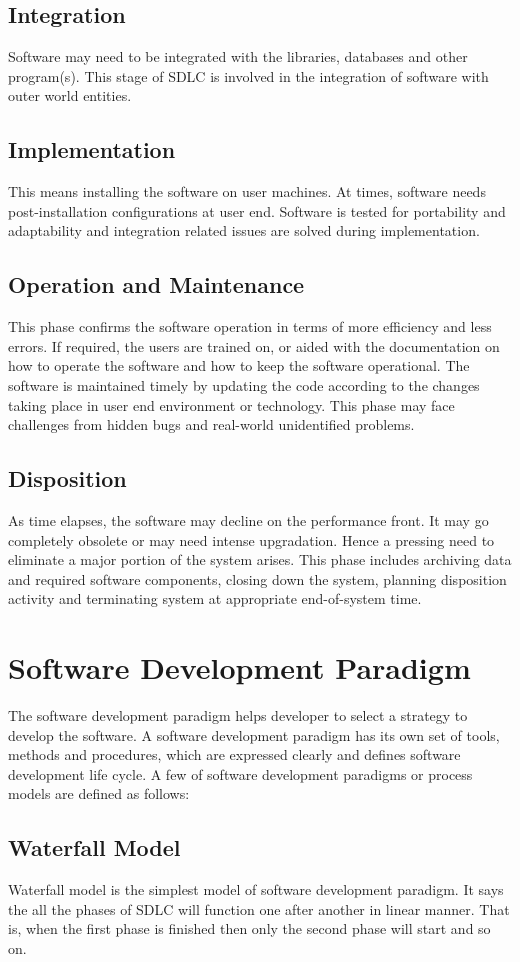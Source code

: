 \documentclass[11pt]{article}
\begin{document}
\subsection{Integration}
Software may need to be integrated with the libraries, databases and other program(s). This stage of SDLC is involved in the integration of software with outer world entities.
\subsection{Implementation}
This means installing the software on user machines. At times, software needs post-installation configurations at user end. Software is tested for portability and adaptability and integration related issues are solved during implementation.
\subsection{Operation and Maintenance}
This phase confirms the software operation in terms of more efficiency and less errors. If required, the users are trained on, or aided with the documentation on how to operate the software and how to keep the software operational. The software is maintained timely by updating the code according to the changes taking place in user end environment or technology. This phase may face challenges from hidden bugs and real-world unidentified problems.
\subsection{Disposition}
As time elapses, the software may decline on the performance front. It may go completely obsolete or may need intense upgradation. Hence a pressing need to eliminate a major portion of the system arises. This phase includes archiving data and required software components, closing down the system, planning disposition activity and terminating system at appropriate end-of-system time.
\section{Software Development Paradigm}
The software development paradigm helps developer to select a strategy to develop the software. A software development paradigm has its own set of tools, methods and procedures, which are expressed clearly and defines software development life cycle. A few of software development paradigms or process models are defined as follows:
\subsection{Waterfall Model}
Waterfall model is the simplest model of software development paradigm. It says the all the phases of SDLC will function one after another in linear manner. That is, when the first phase is finished then only the second phase will start and so on.
 
\end{document}

